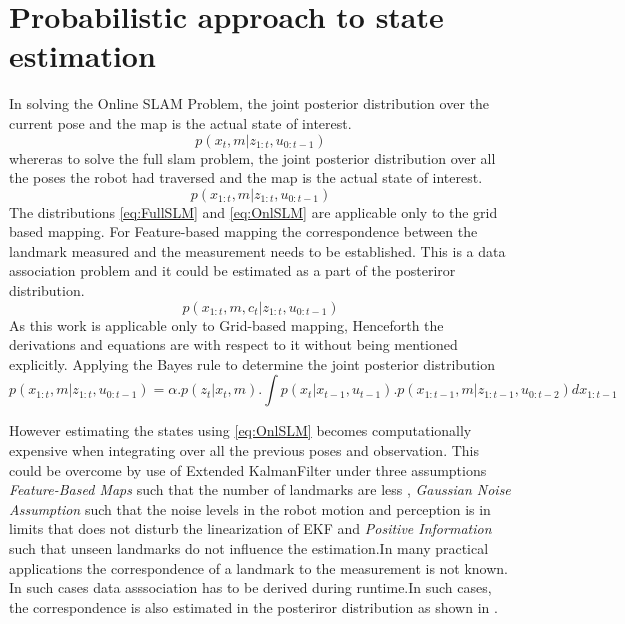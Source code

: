 \section{Probabilistic approach to state estimation}
    In solving the Online SLAM Problem, the joint posterior distribution over the current pose and the map is the actual state of interest.
\begin{equation} \label{eq:OnlSLM}
    p(x_t, m | z_{1:t}, u_{0:t-1})
\end{equation}
whereras to solve the full slam problem, the joint posterior distribution over  all the poses the robot had traversed and the map is the actual state of interest.
\begin{equation} \label{eq:FullSLM}
    p(x_{1:t}, m | z_{1:t}, u_{0:t-1})
\end{equation}
The distributions \ref{eq:FullSLM} and \ref{eq:OnlSLM} are applicable only to the grid based mapping. For Feature-based mapping the correspondence between the landmark measured and the 
measurement needs to be established. This is a data association problem and it could be estimated as a part of the posteriror distribution.
\begin{equation} \label{CorresSLM}
    p(x_{1:t}, m, c_t | z_{1:t}, u_{0:t-1})
\end{equation}
As this work is applicable only to Grid-based mapping, Henceforth the derivations and equations are with respect to it without being mentioned explicitly.
Applying the Bayes rule to determine the joint posterior distribution 
\begin{equation} \label{eq:FullSLMc}
    p(x_{1:t}, m | z_{1:t}, u_{0:t-1}) = \alpha . p(z_t | x_t, m).\int p(x_t| x_{t-1}, u_{t-1}). p(x_{1:t-1}, m | z_{1:t-1}, u_{0:t-2}) dx_{1:t-1}
\end{equation}
\par

However estimating the states using \ref{eq:OnlSLM} becomes computationally expensive when integrating over all the previous poses and observation. This could be overcome by use of Extended KalmanFilter under three assumptions
\textit{Feature-Based Maps} such that the number of landmarks are less , \textit{Gaussian Noise Assumption} such that the noise levels in the robot motion and perception is in limits that does not disturb the
linearization of EKF and \textit{ Positive Information} such that unseen landmarks do not influence the estimation.In many practical applications the correspondence of a landmark to the measurement is not known.
In such cases data asssociation has to be derived during runtime.In such cases, the correspondence is also estimated in the posteriror distribution as shown in .

